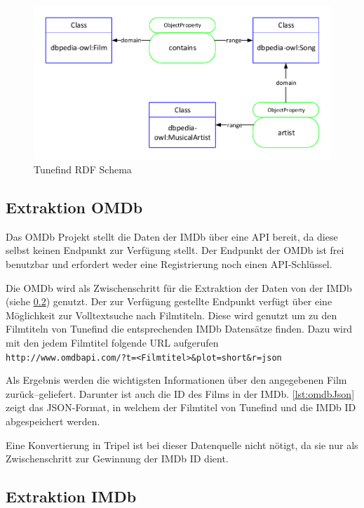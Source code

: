 \documentclass[parskip]{scrartcl}
\begin{document}
\begin{figure}[H]
    \centering
    \caption{Tunefind RDF Schema}
    \label{fig:tunefindrdf}
    \includegraphics[scale=0.8]{tunefind}
\end{figure}
\subsection{Extraktion OMDb}

Das OMDb Projekt stellt die Daten der IMDb über eine API bereit, da diese selbst keinen Endpunkt zur Verfügung stellt. Der Endpunkt der OMDb ist frei benutzbar und erfordert weder eine Registrierung noch einen API-Schlüssel.

Die OMDb wird als Zwischenschritt für die Extraktion der Daten von der IMDb (siehe \ref{subsec:imdb}) genutzt. Der zur Verfügung gestellte Endpunkt verfügt über eine Möglichkeit zur Volltextsuche nach Filmtiteln. Diese wird genutzt um zu den Filmtiteln von Tunefind die entsprechenden IMDb Datensätze finden. Dazu wird mit den jedem Filmtitel folgende URL aufgerufen\\
\texttt{http://www.omdbapi.com/?t=<Filmtitel>\&plot=short\&r=json}

Als Ergebnis werden die wichtigsten Informationen über den angegebenen Film zurück--geliefert. Darunter ist auch die ID des Films in der IMDb. \autoref{lst:omdbJson} zeigt das JSON-Format, in welchem der Filmtitel von Tunefind und die IMDb ID abgespeichert werden.

Eine Konvertierung in Tripel ist bei dieser Datenquelle nicht nötigt, da sie nur als Zwischenschritt zur Gewinnung der IMDb ID dient.

\subsection{Extraktion IMDb}
\label{subsec:imdb}
\end{document}
